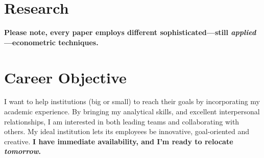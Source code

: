 \documentclass[letterpaper]{article}
\begin{document}
\section*{Research}

{\bf Please note, every paper employs different sophisticated---still \emph{applied}---econometric techniques.}

{}



\section*{Career Objective}

I want to help institutions (big or small) to reach their goals by incorporating my academic experience. By bringing my analytical skills, and excellent interpersonal relationships, I am interested in both leading teams and collaborating with others. My ideal institution lets its employees be innovative, goal-oriented and creative. {\bf I have immediate availability, and I'm ready to relocate \emph{tomorrow}.}

\bigskip
\end{document}
